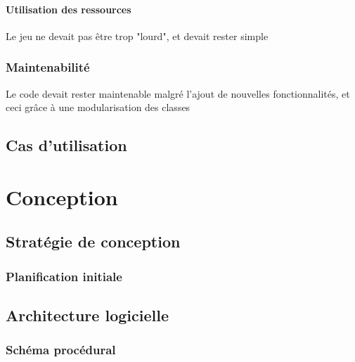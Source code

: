 \documentclass[a4paper,10pt,openany,oneside]{report}
\begin{document}
\subsubsection{Utilisation des ressources}
Le jeu ne devait pas être trop "lourd", et devait rester simple
\subsection{Maintenabilité}
Le code devait rester maintenable malgré l'ajout de nouvelles fonctionnalités, et ceci grâce à une modularisation des classes
\section{Cas d'utilisation}


\chapter{Conception}
\thispagestyle{headings}
\section{Stratégie de conception}
\subsection{Planification initiale}

\section{Architecture logicielle}
\subsection{Schéma procédural}
\end{document}
